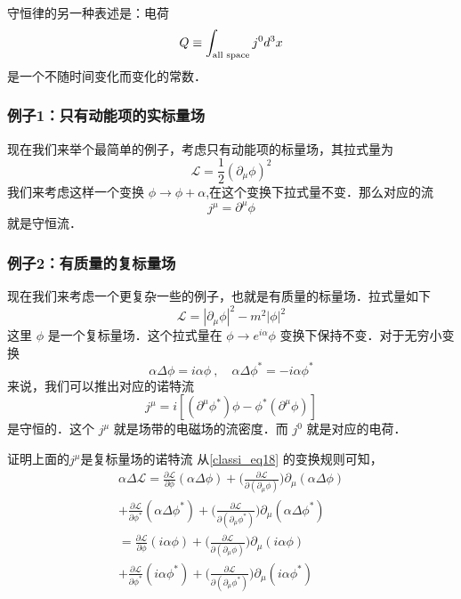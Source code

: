 守恒律的另一种表述是：电荷
\begin{equation}
Q \equiv \int_{\rm all\,\, space} j^0 d^3 x
\end{equation}
是一个不随时间变化而变化的常数．
\subsubsection{例子1：只有动能项的实标量场}
现在我们来举个最简单的例子，考虑只有动能项的标量场，其拉式量为
\begin{equation}
\mathcal L = \frac{1}{2} (\partial_\mu \phi)^2
\end{equation}
我们来考虑这样一个变换 $\phi \rightarrow \phi + \alpha $,在这个变换下拉式量不变．那么对应的流
\begin{equation}
j^\mu = \partial^\mu \phi
\end{equation}
就是守恒流．
\subsubsection{例子2：有质量的复标量场}
现在我们来考虑一个更复杂一些的例子，也就是有质量的标量场．拉式量如下
\begin{equation}
\mathcal L = |\partial_\mu\phi|^2 - m^2 |\phi|^2
\end{equation}
这里 $\phi$ 是一个复标量场．这个拉式量在 $\phi\rightarrow e^{i\alpha}\phi$ 变换下保持不变．对于无穷小变换
\begin{equation}\label{classi_eq18}
\alpha \Delta \phi = i \alpha \phi~,\quad \alpha \Delta \phi^* = -i\alpha \phi^*
\end{equation}
来说，我们可以推出对应的诺特流
\begin{equation}
j^\mu = i[(\partial^\mu \phi^*)\phi-\phi^*(\partial^\mu \phi)]
\end{equation}
是守恒的．这个 $j^\mu$ 就是场带的电磁场的流密度．而 $j^0$ 就是对应的电荷．

\begin{exercise}{证明上面的$j^\mu$是复标量场的诺特流}
从\autoref{classi_eq18} 的变换规则可知，
\begin{align}\nonumber
\alpha \Delta \mathcal L = \frac{\partial \mathcal L}{\partial\phi} (\alpha \Delta \phi) +\bigg( \frac{\partial \mathcal L}{\partial(\partial_\mu\phi)} \bigg) \partial_\mu(\alpha\Delta\phi) \\\nonumber
+\frac{\partial \mathcal L}{\partial\phi^*} (\alpha \Delta \phi^*) +\bigg( \frac{\partial \mathcal L}{\partial(\partial_\mu\phi^*)} \bigg) \partial_\mu(\alpha\Delta\phi^*) \\\nonumber
= \frac{\partial \mathcal L}{\partial\phi} ( i \alpha \phi) +\bigg( \frac{\partial \mathcal L}{\partial(\partial_\mu\phi)} \bigg) \partial_\mu(i \alpha \phi) \\
+\frac{\partial \mathcal L}{\partial\phi^*} (i \alpha \phi^*) +\bigg( \frac{\partial \mathcal L}{\partial(\partial_\mu\phi^*)} \bigg) \partial_\mu(i \alpha \phi^*) 
\end{align}




\end{exercise}



